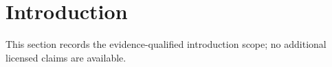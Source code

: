 \section{Introduction}

This section records the evidence-qualified introduction scope; no additional licensed claims are available.
